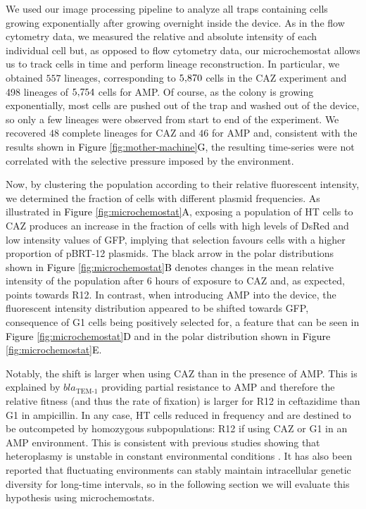 \documentclass[fleqn,12pt]{wlscirep}
\newcommand{\blue}[1]{\textcolor{black}{#1}}
\newcommand{\fig}[1]{\textcolor{black}{#1}}
\begin{document}
We used our image processing pipeline to analyze all traps containing cells growing exponentially after growing overnight inside the device.  As in the flow cytometry data, we measured the relative and absolute intensity of each individual cell but, as opposed to flow cytometry data, our microchemostat allows us to track cells in time and perform lineage reconstruction.  In particular, we obtained $557$ lineages, corresponding to $5\blue{,}870$ cells in the CAZ experiment and 498 lineages of $5\blue{,}754$ cells for AMP.  
Of course, as the colony is growing exponentially, most cells are pushed out of the trap and washed out of the device, so only a few lineages were observed from start to end of the experiment. We recovered $48$ complete lineages for CAZ and $46$ for AMP and, consistent with the results shown in \fig{Figure \ref{fig:mother-machine}G}, the resulting time-series were not correlated with the selective pressure imposed by the environment.

Now, by clustering the population according to their relative fluorescent intensity, we determined the fraction of cells with different plasmid frequencies.
As illustrated in \fig{Figure \ref{fig:microchemostat}A}, exposing a population of HT cells to CAZ produces an increase in the fraction of cells with high levels of DsRed and low intensity values of GFP, implying that selection favours cells with a higher proportion of pBRT-12 plasmids.
The black arrow in the polar distributions shown in \fig{Figure \ref{fig:microchemostat}B} denotes changes in the mean relative intensity of the population after 6 hours of exposure to CAZ and, as expected, points towards R12. 
In contrast, when introducing AMP into the device, the fluorescent intensity distribution appeared to be shifted towards GFP, consequence of G1 cells being positively selected for, a feature that can be seen in \fig{Figure \ref{fig:microchemostat}D} and in the polar distribution shown in \fig{Figure \ref{fig:microchemostat}E}.

Notably, the shift is larger when using CAZ than in the presence of AMP. This is explained by $bla_{\text{TEM-1}}$ providing partial resistance to AMP and therefore the relative fitness (and thus the rate of fixation) is larger for R12 in ceftazidime than G1 in ampicillin.
In any case, HT cells reduced in frequency and are destined to be outcompeted by homozygous subpopulations: R12 if using CAZ or G1 in an AMP environment.  This is consistent with previous studies showing that heteroplasmy is unstable in constant environmental conditions \cite{Rodriguez2018}. It has also been reported that fluctuating environments can stably maintain intracellular genetic diversity for long-time intervals, so in the following section we will evaluate this hypothesis using microchemostats.
\end{document}
